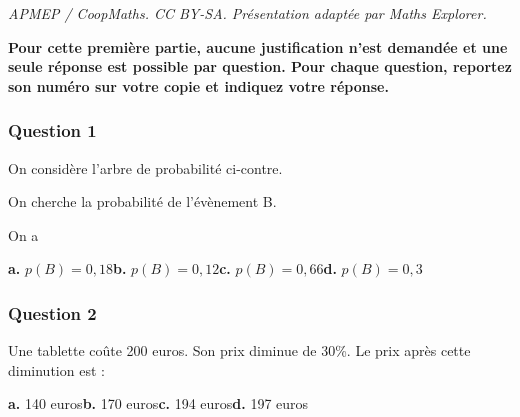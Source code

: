 \documentclass[10pt]{article}
\begin{document}
\noindent\textit{APMEP / CoopMaths. CC BY-SA. Présentation adaptée par Maths Explorer.}\par\medskip
\textbf{Pour cette première partie, aucune justification n'est demandée et une seule réponse est possible par question. Pour chaque question, reportez son numéro sur votre copie et indiquez votre réponse.}

\subsubsection*{Question 1}

\begin{minipage}[t]{0.5\textwidth}
On considère l'arbre de probabilité ci-contre.

On cherche la probabilité de l'évènement B.

\medskip

On a
\end{minipage}

\begin{minipage}[t]{0.45\textwidth}
\vspace{0pt}
\begin{center}
\end{center}
\end{minipage}

\textbf{a.} $p(B) = 0,18$\hfill \textbf{b.} $p(B) = 0,12$\hfill \textbf{c.} $p(B) = 0,66$\hfill \textbf{d.} $p(B) = 0,3$

\subsubsection*{Question 2}
Une tablette coûte 200 euros. Son prix diminue de 30\%. Le prix après cette diminution est :

\textbf{a.} 140 euros\hfill \textbf{b.} 170 euros\hfill \textbf{c.} 194 euros\hfill \textbf{d.} 197 euros
\end{document}
